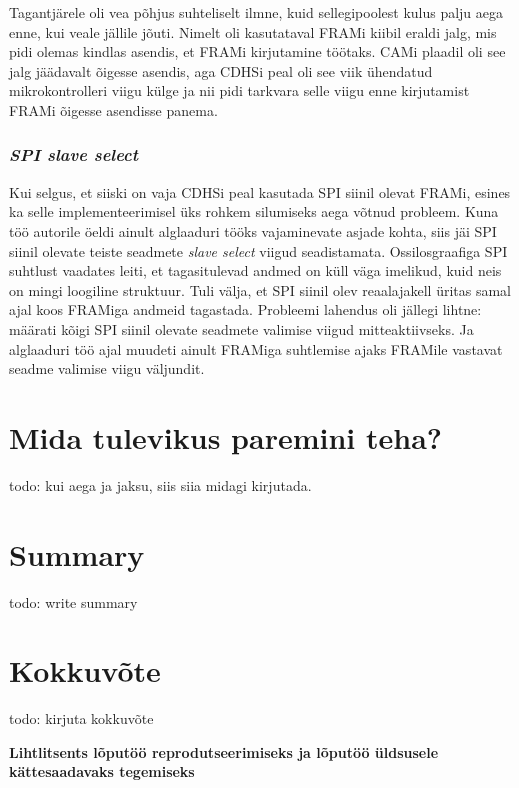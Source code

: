\documentclass[12pt,a4paper]{article}
\begin{document}
Tagantjärele oli vea põhjus suhteliselt ilmne, kuid sellegipoolest kulus palju
aega enne, kui veale jällile jõuti. Nimelt oli kasutataval FRAMi kiibil eraldi
jalg, mis pidi olemas kindlas asendis, et FRAMi kirjutamine töötaks. CAMi
plaadil oli see jalg jäädavalt õigesse asendis, aga CDHSi peal oli see viik
ühendatud mikrokontrolleri viigu külge ja nii pidi tarkvara selle viigu enne
kirjutamist FRAMi õigesse asendisse panema.

\subsubsection{\textit{SPI slave select}}
Kui selgus, et siiski on vaja CDHSi peal kasutada SPI siinil olevat FRAMi,
esines ka selle implementeerimisel üks rohkem silumiseks aega võtnud probleem.
Kuna töö autorile öeldi ainult alglaaduri tööks vajaminevate asjade kohta, siis
jäi SPI siinil olevate teiste seadmete \textit{slave select} viigud
seadistamata. Ossilosgraafiga SPI suhtlust vaadates leiti, et tagasitulevad
andmed on küll väga imelikud, kuid neis on mingi loogiline struktuur. Tuli
välja, et SPI siinil olev reaalajakell üritas samal ajal koos FRAMiga andmeid
tagastada. Probleemi lahendus oli jällegi lihtne: määrati kõigi SPI siinil
olevate seadmete valimise viigud mitteaktiivseks. Ja alglaaduri töö ajal muudeti
ainult FRAMiga suhtlemise ajaks FRAMile vastavat seadme valimise viigu väljundit.

\section{Mida tulevikus paremini teha?}
todo: kui aega ja jaksu, siis siia midagi kirjutada.
\section{Summary}
todo: write summary
\section{Kokkuvõte}
todo: kirjuta kokkuvõte

\label{viited}



\pagebreak
\textbf{Lihtlitsents lõputöö reprodutseerimiseks ja lõputöö üldsusele
kättesaadavaks tegemiseks}\\
\end{document}
